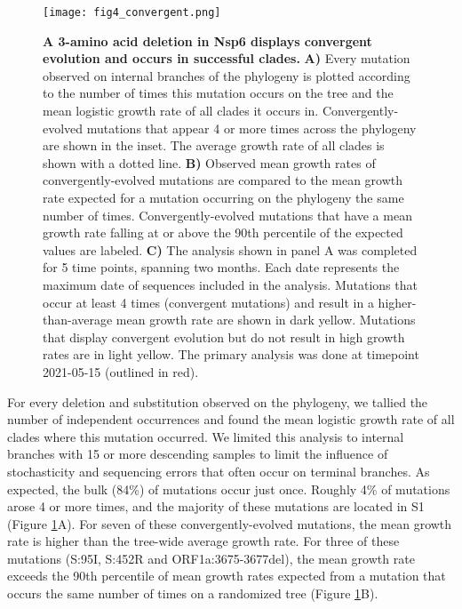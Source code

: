 \documentclass[11pt,oneside,letterpaper]{article}
\begin{document}
\begin{figure}[h!]
	\centerline{\texttt{[image: fig4\_convergent.png]}}
	\caption{\textbf{A 3-amino acid deletion in Nsp6 displays convergent evolution and occurs in successful clades.}
	\textbf{A)} Every mutation observed on internal branches of the phylogeny is plotted according to the number of times this mutation occurs on the tree and the mean logistic growth rate of all clades it occurs in.
	Convergently-evolved mutations that appear 4 or more times across the phylogeny are shown in the inset. The average growth rate of all clades is shown with a dotted line.
	\textbf{B)} Observed mean growth rates of convergently-evolved mutations are compared to the mean growth rate expected for a mutation occurring on the phylogeny the same number of times. Convergently-evolved mutations that have a mean growth rate falling at or above the 90th percentile of the expected values are labeled.
	\textbf{C)} The analysis shown in panel A was completed for 5 time points, spanning two months. Each date represents the maximum date of sequences included in the analysis.
	Mutations that occur at least 4 times (convergent mutations) and result in a higher-than-average mean growth rate are shown in dark yellow.
	Mutations that display convergent evolution but do not result in high growth rates are in light yellow.
	The primary analysis was done at timepoint 2021-05-15 (outlined in red).
	}
	\label{fig:convergent}
\end{figure}

For every deletion and substitution observed on the phylogeny, we tallied the number of independent occurrences and found the mean logistic growth rate of all clades where this mutation occurred.
We limited this analysis to internal branches with 15 or more descending samples to limit the influence of stochasticity and sequencing errors that often occur on terminal branches.
As expected, the bulk (84\%) of mutations occur just once.
Roughly 4\% of mutations arose 4 or more times, and the majority of these mutations are located in S1 (Figure \ref{fig:convergent}A).
For seven of these convergently-evolved mutations, the mean growth rate is higher than the tree-wide average growth rate.
For three of these mutations (S:95I, S:452R and ORF1a:3675-3677del), the mean growth rate exceeds the 90th percentile of mean growth rates expected from a mutation that occurs the same number of times on a randomized tree (Figure \ref{fig:convergent}B).
\end{document}
